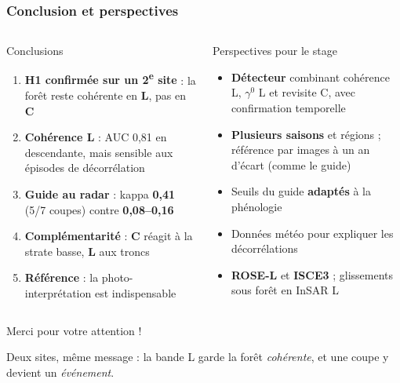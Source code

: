 \documentclass[aspectratio=169]{beamer}
\newcommand{\Lb}[1]{\textcolor{Lband}{\textbf{#1}}}
\newcommand{\Cb}[1]{\textcolor{Cband}{\textbf{#1}}}
\begin{document}
\begin{frame}{\phantom{x}}
	\frametitle{Conclusion et perspectives}
	\vspace{-6pt}\small
	\begin{columns}[T]
		\begin{block}{Conclusions}
			\footnotesize
			\begin{enumerate}
				\setlength{\itemsep}{3pt}
				\item \textbf{H1 confirmée sur un 2\textsuperscript{e} site} : la forêt reste cohérente en \Lb{L}, pas en \Cb{C}
				\item \textbf{Cohérence L} : AUC 0,81 en descendante, mais sensible aux épisodes de décorrélation
				\item \textbf{Guide au radar} : kappa \Lb{0,41} (5/7 coupes) contre \Cb{0,08--0,16}
				\item \textbf{Complémentarité} : \Cb{C} réagit à la strate basse, \Lb{L} aux troncs
				\item \textbf{Référence} : la photo-interprétation est indispensable
			\end{enumerate}
		\end{block}

		\begin{block}{Perspectives pour le stage}
			\scriptsize
			\begin{itemize}
				\setlength{\itemsep}{1pt}
				\item \textbf{Détecteur} combinant cohérence L, $\gamma^0$ L et revisite C, avec confirmation
				temporelle
				\item \textbf{Plusieurs saisons} et régions ; référence par images à un an d'écart (comme le guide)
				\item Seuils du guide \textbf{adaptés} à la phénologie
				\item Données météo pour expliquer les décorrélations
				\item \textbf{ROSE-L} et \textbf{ISCE3} \parencite{esa2020rosel,isce3} ; glissements sous forêt en InSAR L
			\end{itemize}
		\end{block}
	\end{columns}
\end{frame}

\begin{frame}
	\vfill
	\centering
	{\Large Merci pour votre attention !}

	\vspace{1em}
	\small\textcolor{mydgray}{Deux sites, même message : la bande L garde la forêt \emph{cohérente}, et une coupe y
		devient un \emph{événement}.}
	\vfill
\end{frame}
\end{document}
